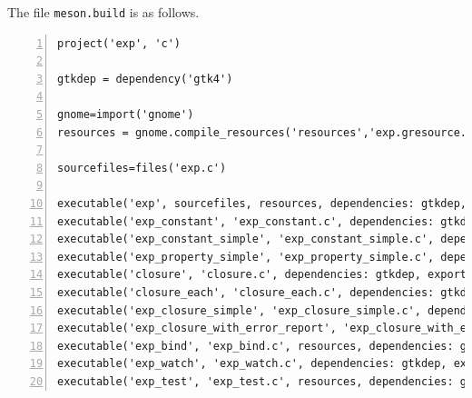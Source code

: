 The file \passthrough{\lstinline!meson.build!} is as follows.

\begin{lstlisting}[numbers=left]
project('exp', 'c')

gtkdep = dependency('gtk4')

gnome=import('gnome')
resources = gnome.compile_resources('resources','exp.gresource.xml')

sourcefiles=files('exp.c')

executable('exp', sourcefiles, resources, dependencies: gtkdep, export_dynamic: true, install: false)
executable('exp_constant', 'exp_constant.c', dependencies: gtkdep, export_dynamic: true, install: false)
executable('exp_constant_simple', 'exp_constant_simple.c', dependencies: gtkdep, export_dynamic: true, install: false)
executable('exp_property_simple', 'exp_property_simple.c', dependencies: gtkdep, export_dynamic: true, install: false)
executable('closure', 'closure.c', dependencies: gtkdep, export_dynamic: true, install: false)
executable('closure_each', 'closure_each.c', dependencies: gtkdep, export_dynamic: true, install: false)
executable('exp_closure_simple', 'exp_closure_simple.c', dependencies: gtkdep, export_dynamic: true, install: false)
executable('exp_closure_with_error_report', 'exp_closure_with_error_report.c', dependencies: gtkdep, export_dynamic: true, install: false)
executable('exp_bind', 'exp_bind.c', resources, dependencies: gtkdep, export_dynamic: true, install: false)
executable('exp_watch', 'exp_watch.c', dependencies: gtkdep, export_dynamic: true, install: false)
executable('exp_test', 'exp_test.c', resources, dependencies: gtkdep, export_dynamic: true, install: false)
\end{lstlisting}
